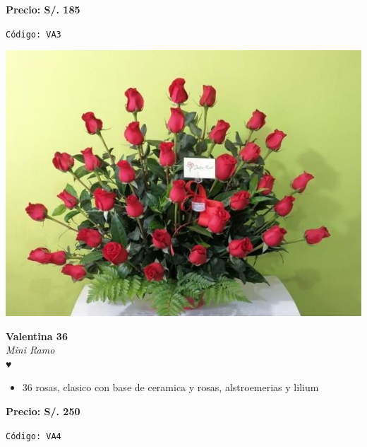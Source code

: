 \documentclass[12pt]{article}
\begin{document}
\vspace{0.3cm}
\begin{center}
   \textbf{\Large Precio: \textcolor[HTML]{228B22}{S/. 185 }}
\end{center}
\begin{center}
    \textcolor[HTML]{191970}{\texttt{Código: VA3}}
\end{center}
\vspace{1cm}
\noindent
\begin{minipage}{0.35\textwidth}
    \includegraphics[width=1.0\textwidth]{imagenes_extraidas/image_11_3}
\end{minipage}
\hspace{1cm}
\begin{minipage}{0.6\textwidth}
    \textcolor[HTML]{FF8C00}{\textbf{\huge Valentina 36 }}\\
    {\textit{Mini Ramo}} \\
    \textcolor[HTML]{FF8C00}{\Huge ♥} \\
    \vspace{0.5cm}
    \begin{itemize}
        \item 36 rosas, clasico con base de ceramica y rosas, alstroemerias y lilium
    \end{itemize}
\end{minipage}
\vspace{0.3cm}
\begin{center}
   \textbf{\Large Precio: \textcolor[HTML]{228B22}{S/. 250 }}
\end{center}
\begin{center}
    \textcolor[HTML]{191970}{\texttt{Código: VA4}}
\end{center}
\end{document}
